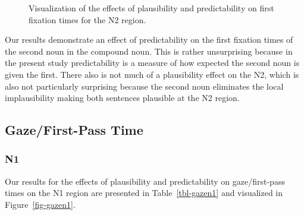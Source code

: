 \documentclass[
  letterpaper,
  DIV=11,
  numbers=noendperiod,
  nottoc]{scrreprt}
\begin{document}
\begin{figure}[htbp]


\caption{\label{fig-firstfixn2}Visualization of the effects of
plausibility and predictability on first fixation times for the N2
region.}

\end{figure}%

Our results demonstrate an effect of predictability on the first
fixation times of the second noun in the compound noun. This is rather
unsurprising because in the present study predictability is a measure of
how expected the second noun is given the first. There also is not much
of a plausibility effect on the N2, which is also not particularly
surprising because the second noun eliminates the local implausibility
making both sentences plausible at the N2 region.

\subsection{Gaze/First-Pass Time}\label{gazefirst-pass-time}

\subsubsection{N1}\label{n1-1}

Our results for the effects of plausibility and predictability on
gaze/first-pass times on the N1 region are presented in
Table~\ref{tbl-gazen1} and visualized in Figure~\ref{fig-gazen1}.
\end{document}
